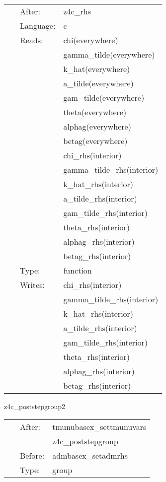  \begin{tabular*}{160mm}{cll} 
~ & After:  & z4c\_rhs \\ 
~ & Language:  & c \\ 
~ & Reads:  & chi(everywhere) \\ 
~& ~ &gamma\_tilde(everywhere)\\ 
~& ~ &k\_hat(everywhere)\\ 
~& ~ &a\_tilde(everywhere)\\ 
~& ~ &gam\_tilde(everywhere)\\ 
~& ~ &theta(everywhere)\\ 
~& ~ &alphag(everywhere)\\ 
~& ~ &betag(everywhere)\\ 
~& ~ &chi\_rhs(interior)\\ 
~& ~ &gamma\_tilde\_rhs(interior)\\ 
~& ~ &k\_hat\_rhs(interior)\\ 
~& ~ &a\_tilde\_rhs(interior)\\ 
~& ~ &gam\_tilde\_rhs(interior)\\ 
~& ~ &theta\_rhs(interior)\\ 
~& ~ &alphag\_rhs(interior)\\ 
~& ~ &betag\_rhs(interior)\\ 
~ & Type:  & function \\ 
~ & Writes:  & chi\_rhs(interior) \\ 
~& ~ &gamma\_tilde\_rhs(interior)\\ 
~& ~ &k\_hat\_rhs(interior)\\ 
~& ~ &a\_tilde\_rhs(interior)\\ 
~& ~ &gam\_tilde\_rhs(interior)\\ 
~& ~ &theta\_rhs(interior)\\ 
~& ~ &alphag\_rhs(interior)\\ 
~& ~ &betag\_rhs(interior)\\ 
\end{tabular*} 


\vspace{5mm}


\hspace{5mm} z4c\_poststepgroup2 

\hspace{5mm}{\it post-process z4c variables, part 2 } 


\hspace{5mm}

 \begin{tabular*}{160mm}{cll} 
~ & After:  & tmunubasex\_settmunuvars \\ 
~& ~ &z4c\_poststepgroup\\ 
~ & Before:  & admbasex\_setadmrhs \\ 
~ & Type:  & group \\ 
\end{tabular*} 


